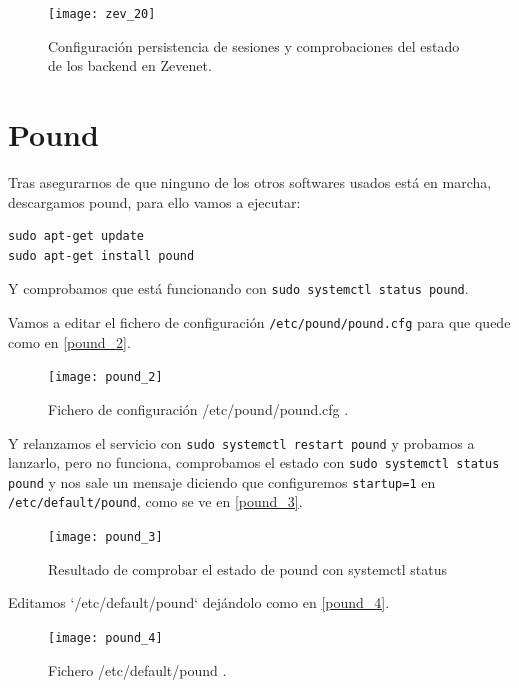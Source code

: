 \begin{figure}[h!]
\begin{center}
\caption{Configuración persistencia de sesiones y comprobaciones del estado de los backend en Zevenet.}
\label{zev_20}
\texttt{[image: zev\_20]}
\end{center}
\end{figure}

\chapter{Pound}

Tras asegurarnos de que ninguno de los otros softwares usados está en marcha, descargamos pound, para ello vamos a ejecutar:

\begin{verbatim}
sudo apt-get update
sudo apt-get install pound
\end{verbatim}

Y comprobamos que está funcionando con \verb|sudo systemctl status pound|.

Vamos a editar el fichero de configuración \verb|/etc/pound/pound.cfg| para que quede como en \eqref{pound_2}.

\begin{figure}[h!]
\begin{center}
\caption{Fichero de configuración /etc/pound/pound.cfg .}
\label{pound_2}
\texttt{[image: pound\_2]}
\end{center}
\end{figure}

Y relanzamos el servicio con \verb|sudo systemctl restart pound| y probamos a lanzarlo, pero no funciona, comprobamos el estado con \verb|sudo systemctl status pound| y nos sale un mensaje diciendo que configuremos \verb|startup=1| en \verb|/etc/default/pound|, como se ve en \eqref{pound_3}.

\begin{figure}[h!]
\begin{center}
\caption{Resultado de comprobar el estado de pound con systemctl status}
\label{pound_3}
\texttt{[image: pound\_3]}
\end{center}
\end{figure}

Editamos `/etc/default/pound` dejándolo como en \eqref{pound_4}.

\begin{figure}[h!]
\begin{center}
\caption{Fichero /etc/default/pound .}
\label{pound_4}
\texttt{[image: pound\_4]}
\end{center}
\end{figure}

